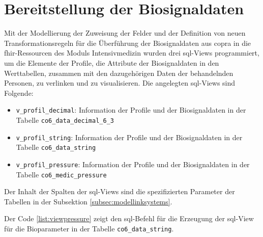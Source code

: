 \section{Bereitstellung der Biosignaldaten} \label{sec:prepdwtofhir}

Mit der Modellierung der Zuweisung der Felder und der Definition von neuen Transformationsregeln für die Überführung der Biosignaldaten aus \ac{copra} in die \ac{fhir}-Ressourcen des Moduls \glqq Intensivmedizin\grqq{} wurden drei \ac{sql}-Views programmiert, um die Elemente der Profile, die Attribute der Biosignaldaten in den Werttabellen, zusammen mit den dazugehörigen Daten der behandelnden Personen, zu verlinken und zu visualisieren. Die angelegten \ac{sql}-Views sind Folgende:

\begin{itemize}
	\item \texttt{v\_profil\_decimal}: Information der Profile und der Biosignaldaten in der Tabelle \texttt{co6\_data\_decimal\_6\_3}
	\item \texttt{v\_profil\_string}: Information der Profile und der Biosignaldaten in der Tabelle \texttt{co6\_data\_string}
    \item \texttt{v\_profil\_pressure}: Information der Profile und der Biosignaldaten in der Tabelle \texttt{co6\_medic\_pressure}
\end{itemize}

Der Inhalt der Spalten der \ac{sql}-Views sind die spezifizierten Parameter der Tabellen in der Subsektion \ref{subsec:modellinksystems}. 

Der Code \ref{list:viewpressure} zeigt den \ac{sql}-Befehl für die Erzeugung der \ac{sql}-View für die Bioparameter in der Tabelle \texttt{co6\_data\_string}. 

